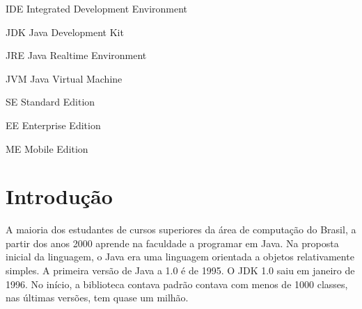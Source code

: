 \documentclass[
	12pt,				%
	twoside,			%
	a4paper,			%
	english,			%
	french,				%
	spanish,			%
	brazil				%
	]{abntex2}
\newcommand{\listofquadrosname}{Lista de quadros}
\begin{document}
\listoffigures*
\cleardoublepage


\listoftables*
\cleardoublepage

\begin{siglas}
  \item[IDE] Integrated Development Environment
  \item[JDK] Java Development Kit
  \item[JRE] Java Realtime Environment
  \item[JVM] Java Virtual Machine
  \item[SE] Standard Edition
  \item[EE] Enterprise Edition
  \item[ME] Mobile Edition
\end{siglas}


\tableofcontents*
\cleardoublepage



\textual

\chapter{Introdução}

A maioria dos estudantes de cursos superiores da área de computação do Brasil, a partir dos anos 2000 aprende na faculdade a programar em Java. Na proposta inicial da linguagem, o Java era uma linguagem orientada a objetos relativamente simples. A primeira versão de Java a 1.0 é de 1995. O JDK 1.0 saiu em janeiro de 1996. No início, a biblioteca contava padrão contava com menos de 1000 classes, nas últimas versões, tem quase um milhão.
\end{document}
